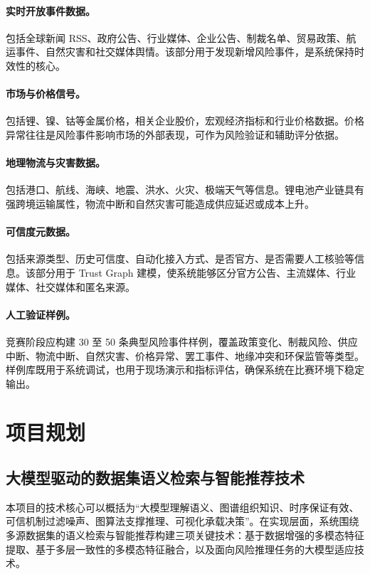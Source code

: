 \documentclass[12pt,a4paper]{article}
\begin{document}
\paragraph{实时开放事件数据。}包括全球新闻 RSS、政府公告、行业媒体、企业公告、制裁名单、贸易政策、航运事件、自然灾害和社交媒体舆情。该部分用于发现新增风险事件，是系统保持时效性的核心。

\paragraph{市场与价格信号。}包括锂、镍、钴等金属价格，相关企业股价，宏观经济指标和行业价格数据。价格异常往往是风险事件影响市场的外部表现，可作为风险验证和辅助评分依据。

\paragraph{地理物流与灾害数据。}包括港口、航线、海峡、地震、洪水、火灾、极端天气等信息。锂电池产业链具有强跨境运输属性，物流中断和自然灾害可能造成供应延迟或成本上升。

\paragraph{可信度元数据。}包括来源类型、历史可信度、自动化接入方式、是否官方、是否需要人工核验等信息。该部分用于 Trust Graph 建模，使系统能够区分官方公告、主流媒体、行业媒体、社交媒体和匿名来源。

\paragraph{人工验证样例。}竞赛阶段应构建 30 至 50 条典型风险事件样例，覆盖政策变化、制裁风险、供应中断、物流中断、自然灾害、价格异常、罢工事件、地缘冲突和环保监管等类型。样例库既用于系统调试，也用于现场演示和指标评估，确保系统在比赛环境下稳定输出。

\section{项目规划}
\subsection{大模型驱动的数据集语义检索与智能推荐技术}

本项目的技术核心可以概括为“大模型理解语义、图谱组织知识、时序保证有效、可信机制过滤噪声、图算法支撑推理、可视化承载决策”。在实现层面，系统围绕多源数据集的语义检索与智能推荐构建三项关键技术：基于数据增强的多模态特征提取、基于多层一致性的多模态特征融合，以及面向风险推理任务的大模型适应技术。
\end{document}
